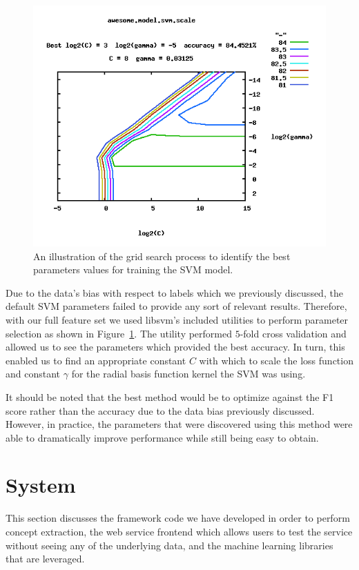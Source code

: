 \documentclass[preprint]{style}
\begin{document}
\begin{figure}
\begin{center}
	\includegraphics[width=1\columnwidth]{figures/parameter-selection.png}
\end{center}
\caption{An illustration of the grid search process to identify the best parameters values for training the SVM model.}
\label{fig:parameter_selection}
\end{figure}

Due to the data's bias with respect to labels which we previously discussed, the default SVM parameters failed to provide any sort of relevant results. Therefore, with our full feature set we used libsvm's included utilities to perform parameter selection as shown in Figure~\ref{fig:parameter_selection}. The utility performed $5$-fold cross validation and allowed us to see the parameters which provided the best accuracy. In turn, this enabled us to find an appropriate constant $C$ with which to scale the loss function and constant $\gamma$ for the radial basis function kernel the SVM was using.

It should be noted that the best method would be to optimize against the F1 score rather than the accuracy due to the data bias previously discussed. However, in practice, the parameters that were discovered using this method were able to dramatically improve performance while still being easy to obtain.


\section{System}
This section discusses the framework code we have developed in order to perform concept extraction, the web service frontend which allows users to test the service without seeing any of the underlying data, and the machine learning libraries that are leveraged. 
\end{document}
